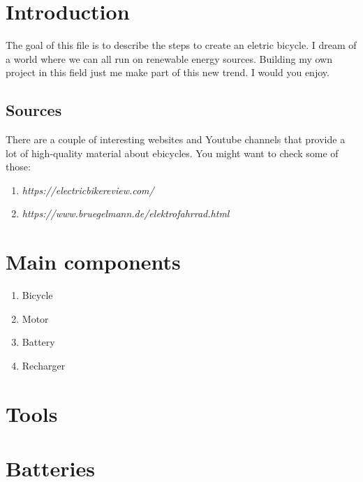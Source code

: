 



\tableofcontents
\newpage
\listoffigures
\newpage
\listoftables
\newpage
{}

\section{Introduction}
The goal of this file is to describe the steps to create an eletric bicycle. I dream of a world where we can all run on renewable energy sources. Building my own project in this field just me make part of this new trend. I would you enjoy.

\subsection{Sources}

There are a couple of interesting websites and Youtube channels that provide a lot of high-quality material about ebicycles. You might want to check some of those:

\begin{enumerate}
\item \textit{https://electricbikereview.com/}
\item \textit{https://www.bruegelmann.de/elektrofahrrad.html}
\end{enumerate}

\section{Main components}

\begin{enumerate}
\item Bicycle
\item Motor
\item Battery
\item Recharger

\end{enumerate}

\section{Tools}


\section{Batteries}

